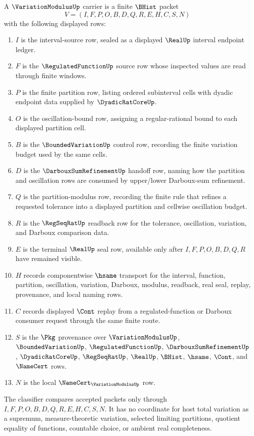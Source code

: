 \begin{definition}
\label{def:variation-modulus-carrier}
A $\VariationModulusUp$ carrier is a finite $\BHist$ packet
$$
V=(I,F,P,O,B,D,Q,R,E,H,C,S,N)
$$
with the following displayed rows:
\begin{enumerate}
\item $I$ is the interval-source row, sealed as a displayed $\RealUp$ interval endpoint ledger.
\item $F$ is the $\RegulatedFunctionUp$ source row whose inspected values are read through finite windows.
\item $P$ is the finite partition row, listing ordered subinterval cells with dyadic endpoint data supplied by $\DyadicRatCoreUp$.
\item $O$ is the oscillation-bound row, assigning a regular-rational bound to each displayed partition cell.
\item $B$ is the $\BoundedVariationUp$ control row, recording the finite variation budget used by the same cells.
\item $D$ is the $\DarbouxSumRefinementUp$ handoff row, naming how the partition and oscillation rows are consumed by upper/lower Darboux-sum refinement.
\item $Q$ is the partition-modulus row, recording the finite rule that refines a requested tolerance into a displayed partition and cellwise oscillation budget.
\item $R$ is the $\RegSeqRatUp$ readback row for the tolerance, oscillation, variation, and Darboux comparison data.
\item $E$ is the terminal $\RealUp$ seal row, available only after $I,F,P,O,B,D,Q,R$ have remained visible.
\item $H$ records componentwise $\hsame$ transport for the interval, function, partition, oscillation, variation, Darboux, modulus, readback, real seal, replay, provenance, and local naming rows.
\item $C$ records displayed $\Cont$ replay from a regulated-function or Darboux consumer request through the same finite route.
\item $S$ is the $\Pkg$ provenance over $\VariationModulusUp$, $\BoundedVariationUp$, $\RegulatedFunctionUp$, $\DarbouxSumRefinementUp$, $\DyadicRatCoreUp$, $\RegSeqRatUp$, $\RealUp$, $\BHist$, $\hsame$, $\Cont$, and $\NameCert$ rows.
\item $N$ is the local $\NameCert_{\VariationModulusUp}$ row.
\end{enumerate}
The classifier compares accepted packets only through $I,F,P,O,B,D,Q,R,E,H,C,S,N$. It has no coordinate for host total variation as a supremum, measure-theoretic variation, selected limiting partitions, quotient equality of functions, countable choice, or ambient real completeness.
\end{definition}

